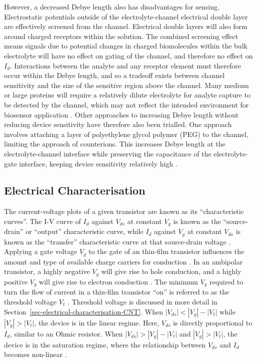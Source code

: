 \documentclass[
  a4paper,
]{scrbook}
\begin{document}
However, a decreased Debye length also has disadvantages for sensing.
Electrostatic potentials outside of the electrolyte-channel electrical
double layer are effectively screened from the channel. Electrical
double layers will also form around charged receptors within the
solution. The combined screening effect means signals due to potential
changes in charged biomolecules within the bulk electrolyte will have no
effect on gating of the channel, and therefore no effect on \(I_d\).
Interactions between the analyte and any receptor element must therefore
occur within the Debye length, and so a tradeoff exists between channel
sensitivity and the size of the sensitive region above the channel. Many
medium or large proteins will require a relatively dilute electrolyte
for analyte capture to be detected by the channel, which may not reflect
the intended environment for biosensor application
\autocite{Stern2007,Piccinini2018,Shkodra2021}. Other approaches to
increasing Debye length without reducing device sensitivity have
therefore also been trialled. One approach involves attaching a layer of
polyethylene glycol polymer (PEG) to the channel, limiting the approach
of counterions. This increases Debye length at the electrolyte-channel
interface while preserving the capacitance of the electrolyte-gate
interface, keeping device sensitivity relatively high
\autocite{Gao2016,Filipiak2018,Kesler2020,Albarghouthi2022}.

\hypertarget{electrical-characterisation}{%
\subsection{Electrical
Characterisation}\label{electrical-characterisation}}

The current-voltage plots of a given transistor are known as its
``characteristic curves''. The I-V curve of \(I_d\) against \(V_{ds}\)
at constant \(V_g\) is known as the ``source-drain'' or ``output''
characteristic curve, while \(I_d\) against \(V_g\) at constant
\(V_{ds}\) is known as the ``transfer'' characteristic curve at that
source-drain voltage \autocite{Kauffman2008,Petti2016,Shkodra2021}.
Applying a gate voltage \(V_g\) to the gate of an thin-film transistor
influences the amount and type of available charge carriers for
conduction \autocite{Avouris2007,Tran2016,Heller2009a}. In an ambipolar
transistor, a highly negative \(V_g\) will give rise to hole conduction,
and a highly positive \(V_g\) will give rise to electron conduction
\autocite{Avouris2007,Yao2021,Li2023}. The minimum \(V_g\) required to
turn the flow of current in a thin-film transistor ``on'' is referred to
as the threshold voltage \(V_t\)
\autocite{Petti2016,Shkodra2021,Li2023}. Threshold voltage is discussed
in more detail in Section~\ref{sec-electrical-characterisation-CNT}.
When \(|V_{ds}| < |V_g| - |V_t|\) while \(|V_g|>|V_t|\), the device is
in the linear regime. Here, \(V_{ds}\) is directly proportional to
\(I_{d}\), similar to an Ohmic resistor. When
\(|V_{ds}| > |V_g| - |V_t|\) and \(|V_g|>|V_t|\), the device is in the
saturation regime, where the relationship between \(V_{ds}\) and
\(I_{d}\) becomes non-linear \autocite{Petti2016,Shkodra2021,Li2023}.
\end{document}
